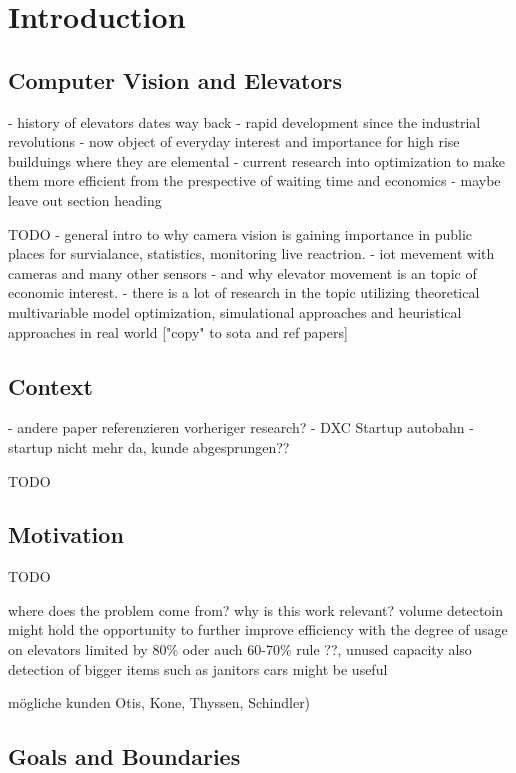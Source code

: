 \chapter{Introduction}
\label{chap:intro}

\section{Computer Vision and Elevators}

- history of elevators dates way back
- rapid development since the industrial revolutions
- now object of everyday interest and importance for high rise builduings where they are elemental
- current research into optimization to make them more efficient from the prespective of waiting time and economics
- maybe leave out section heading


TODO
- general intro to why camera vision is gaining importance in public places for survialance, statistics, monitoring live reactrion. 
- iot mevement with cameras and many other sensors
- and why elevator movement is an topic of economic interest.
- there is a lot of research in the topic utilizing theoretical multivariable model optimization, simulational approaches and heuristical approaches in real world ["copy" to sota and ref papers]


\section{Context}

- andere paper referenzieren vorheriger research?
- DXC Startup autobahn 
- startup nicht mehr da, kunde abgesprungen??


TODO

\section{Motivation}


TODO

where does the problem come from?
why is this work relevant?
volume detectoin might hold the opportunity to further improve efficiency with the degree of usage on elevators
limited by 80\% oder auch 60-70\% rule ??, unused capacity
also detection of bigger items such as janitors cars might be useful


mögliche kunden Otis, Kone, Thyssen, Schindler)

\section{Goals and Boundaries}

